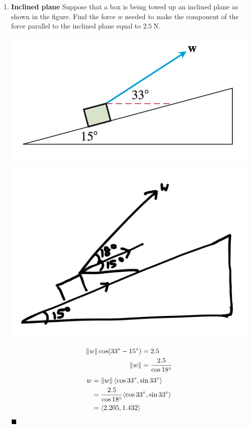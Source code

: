 \begin{enumerate}
    \item \textbf{Inclined plane} Suppose that a box is being towed up an inclined plane as shown in the figure. Find the force $w$ needed to make the component of the force parallel to the inclined plane equal to $2.5 \mathrm{~N}$.
          \begin{center}
              \includegraphics[scale=0.5]{assets/thomas12.3q26.png}
          \end{center}
          \sol{}
          \begin{center}
              \includegraphics[scale=0.4]{assets/thomas12.3q26sol.png}
          \end{center}
          \begin{align*}
              \left\lVert w\right\rVert \cos (33^{\circ} - 15^{\circ}) & = 2.5                          \\
              \left\lVert w\right\rVert                                & = \dfrac{2.5}{\cos 18^{\circ}}
          \end{align*}
          \begin{align*}
              w & = \left\lVert w\right\rVert \langle \cos 33^{\circ}, \sin 33^{\circ} \rangle                    \\
                & =\dfrac{2.5}{\cos 18^{\circ}} \langle \cos 33^{\circ}, \sin 33^{\circ} \rangle \\
                & = \langle 2.205, 1.432 \rangle                                                 \\
          \end{align*}
          $\hfill\blacksquare$


\end{enumerate}
